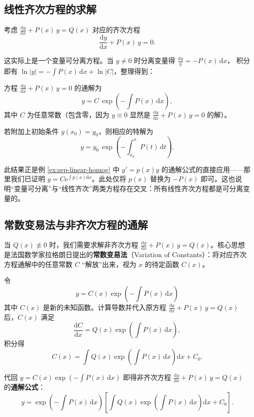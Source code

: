 \documentclass[lang=cn,11pt]{elegantbook}
\begin{document}
\subsection{线性齐次方程的求解}

考虑 $\frac{\mathrm{d}y}{\mathrm{d}x}+P(x)\,y=Q(x)$ 对应的齐次方程
\[
\frac{\mathrm{d}y}{\mathrm{d}x}+P(x)\,y=0. \tag{}
\]

这实际上是一个变量可分离方程。当 $y \neq 0$ 时分离变量得
$\displaystyle\frac{\mathrm{d}y}{y}=-P(x)\,\mathrm{d}x$，
积分即有 $\ln|y|=-\int P(x)\,\mathrm{d}x+\ln|C|$，整理得到：

\begin{theorem}[线性齐次方程通解] \label{thm:linear-homog-sol}
方程 $\frac{\mathrm{d}y}{\mathrm{d}x}+P(x)\,y=0$ 的通解为
\[
\boxed{y=C\,\exp\!\left(-\int P(x)\,\mathrm{d}x\right)},
\]
其中 $C$ 为任意常数（包含零，因为 $y\equiv 0$ 显然是 $\frac{\mathrm{d}y}{\mathrm{d}x}+P(x)\,y=0$ 的解）。
\end{theorem}

若附加上初始条件 $y(x_0)=y_0$，则相应的特解为
\[
y=y_0\,\exp\!\left(-\int_{x_0}^{x}P(t)\,\mathrm{d}t\right).
\]
\begin{remark}
此结果正是例 \ref{ex:sep-linear-homog} 中 $y'=p(x)y$ 的通解公式的直接应用——那里我们已证明 $y=C\mathrm{e}^{\int p(x)\mathrm{d}x}$。此处仅将 $p(x)$ 替换为 $-P(x)$ 即可。这也说明``变量可分离''与``线性齐次''两类方程存在交叉：所有线性齐次方程都是可分离变量的。
\end{remark}

\subsection{常数变易法与非齐次方程的通解}

当 $Q(x)\not\equiv 0$ 时，我们需要求解非齐次方程 $\frac{\mathrm{d}y}{\mathrm{d}x}+P(x)\,y=Q(x)$。核心思想是法国数学家拉格朗日提出的\textbf{常数变易法}（Variation of Constants）：将对应齐次方程通解中的任意常数 $C$ ``解放''出来，视为 $x$ 的待定函数 $C(x)$。

\begin{theorem}[常数变易法] \label{thm:variation-of-constants}
令
\[
y=C(x)\exp\!\left(-\int P(x)\,\mathrm{d}x\right)
\]
其中 $C(x)$ 是新的未知函数。计算导数并代入原方程 $\frac{\mathrm{d}y}{\mathrm{d}x}+P(x)\,y=Q(x)$ 后，$C(x)$ 满足
\[
\frac{\mathrm{d}C}{\mathrm{d}x}=Q(x)\exp\!\left(\int P(x)\,\mathrm{d}x\right),
\]
积分得
\[
C(x)=\int Q(x)\exp\!\left(\int P(x)\,\mathrm{d}x\right)\mathrm{d}x+C_0.
\]

代回 $y=C(x)\exp\!\left(-\int P(x)\,\mathrm{d}x\right)$ 即得非齐次方程 $\frac{\mathrm{d}y}{\mathrm{d}x}+P(x)\,y=Q(x)$ 的\textbf{通解公式}：
\[
\boxed{
y=\exp\!\left(-\int P(x)\,\mathrm{d}x\right)\left[\int Q(x)\exp\!\left(\int P(x)\,\mathrm{d}x\right)\mathrm{d}x+C_0\right].
} 
\]
\end{theorem}
\end{document}

